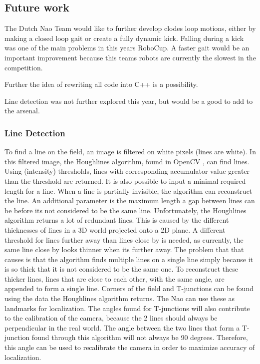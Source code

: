 \documentclass[11pt,a4paper,oneside]{article}
\begin{document}
\subsection{Future work}
The Dutch Nao Team would like to further develop clodes loop motions, either by making a closed loop gait or create a fully dynamic kick. Falling during a kick was one of the main problems in this years RoboCup. A faster gait would be an important improvement because this teams robots are currently the slowest in the competition.

Further the idea of rewriting all code into C++ is a possibility.

Line detection was not further explored this year, but would be a good to add to the arsenal.


\subsubsection{Line Detection}
To find a line on the field, an image is filtered on white pixels (lines are white). In this filtered image, the Houghlines algorithm, found in OpenCV \cite[p.~156]{Bradski2008}, can find lines. Using (intensity) thresholds, lines with corresponding accumulator value greater than the threshold are returned. It is also possible to input a minimal required length for a line. When a line is partially invisible, the algorithm can reconstruct the line. An additional parameter is the maximum length a gap between lines can be before its not considered to be the same line. 
Unfortunately, the Houghlines algorithm returns a lot of redundant lines. This is caused by the different thicknesses of lines in a 3D world projected onto a 2D plane. A different threshold for lines further away than lines close by is needed, as currently, the same line close by looks thinner when its further away. The problem that that causes is that the algorithm finds multiple lines on a single line simply because it is so thick that it is not considered to be the same one. To reconstruct these thicker lines, lines that are close to each other, with the same angle, are appended to form a single line. 
Corners of the field and T-junctions can be found using the data the Houghlines algorithm returns. The Nao can use these as landmarks for localization. The angles found for T-junctions will also contribute to the calibration of the camera, because the 2 lines should always be perpendicular in the real world. The angle between the two lines that form a T-junction found through this algorithm will not always be 90 degrees. Therefore, this angle can be used to recalibrate the camera in order to maximize accuracy of localization. 
\end{document}
